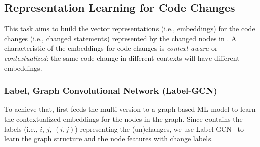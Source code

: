 \subsection{Representation Learning for Code Changes}
\label{vector:sec}



This task aims to build the vector representations (i.e.,
embeddings) for the code changes (i.e., changed statements)
represented by the changed nodes in {\mvpdg}. A characteristic of the
embeddings for code changes is {\em context-aware} or {\em
  contextualized}: the same code change in different contexts
will have different embeddings.

\subsubsection{{\bf Label, Graph Convolutional Network (Label-GCN)}}

To achieve that, {\tool} first feeds the multi-version {\mvpdg} to a
graph-based ML model to learn the contextualized
embeddings for the nodes in the graph. Since {\mvpdg} contains the
labels (i.e., $i$, $j$, $(i,j)$) representing the (un)changes,
we use Label-GCN~\cite{label-gcn} to learn the graph structure and
the node features with change labels.




